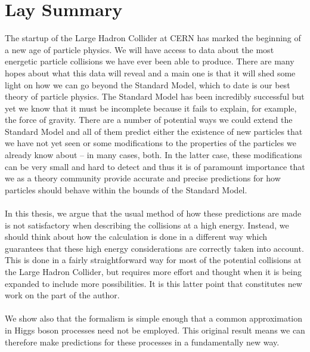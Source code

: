 \chapter*{Lay Summary}

\noindent

\normalsize

The startup of the Large Hadron Collider at CERN has marked the beginning of a new age of particle physics. We will have access to data about the most energetic particle collisions we have ever been able to produce. There are many hopes about what this data will reveal and a main one is that it will shed some light on how we can go beyond the Standard Model, which to date is our best theory of particle physics. The Standard Model has been incredibly successful but yet we know that it must be incomplete because it fails to explain, for example, the force of gravity. There are a number of potential ways we could extend the Standard Model and all of them predict either the existence of new particles that we have not yet seen or some modifications to the properties of the particles we already know about -- in many cases, both. In the latter case, these modifications can be very small and hard to detect and thus it is of paramount importance that we as a theory community provide accurate and precise predictions for how particles should behave within the bounds of the Standard Model. \\
\\
In this thesis, we argue that the usual method of how these predictions are made is not satisfactory when describing the collisions at a high energy. Instead, we should think about how the calculation is done in a different way which guarantees that these high energy considerations are correctly taken into account. This is done in a fairly straightforward way for most of the potential collisions at the Large Hadron Collider, but requires more effort and thought when it is being expanded to include more possibilities. It is this latter point that constitutes new work on the part of the author. \\
\\
We show also that the formalism is simple enough that a common approximation in Higgs boson processes need not be employed. This original result means we can therefore make predictions for these processes in a fundamentally new way. 

